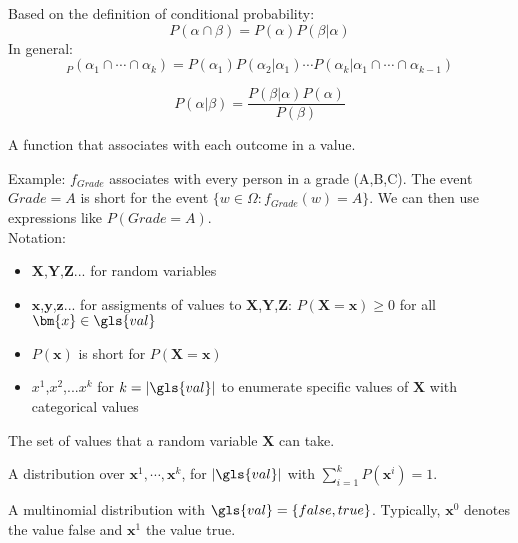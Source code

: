 {%
  Based on the definition of \gls{conditional probability}:
  \begin{equation*}
    P(\alpha\cap\beta)=P(\alpha)P(\beta|\alpha)
  \end{equation*}
  In general:
  \begin{equation*}
    _P(\alpha_1\cap\cdots\cap\alpha_k)=P(\alpha_1)P(\alpha_2|\alpha_1)\cdots P(\alpha_k|\alpha_1\cap\cdots\cap\alpha_{k-1})
  \end{equation*}
}

{%
  \begin{equation*}
    P(\alpha|\beta)=\frac{P(\beta|\alpha)P(\alpha)}{P(\beta)}
  \end{equation*}
}

{%
  A function that associates with each outcome in  a value.

  Example: $f_{Grade}$ associates with every person in  a grade (A,B,C). The event $Grade=A$ is short for the event $\{w\in\Omega:f_{Grade}(w)=A\}$. We can then use expressions like $P(Grade=A)$.\\

  Notation:
  \begin{itemize}
    \item  $\bm{X}$,$\bm{Y}$,$\bm{Z}$... for random variables
    \item  $\bm{x}$,$\bm{y}$,$\bm{z}$... for assigments of values to  $\bm{X}$,$\bm{Y}$,$\bm{Z}$: $P(\bm{X}=\bm{x})\geq0 $ for all $\bm{x}\in \gls{val}$
    \item  $P(\bm{x})$ is short for $P(\bm{X}=\bm{x})$
    \item  $x^1$,$x^2$,...$x^k$ for $k=|\gls{val}|$ to enumerate specific values of $\bm{X}$ with categorical values
  \end{itemize}
}

{%
  The set of values that a \gls{random variable} $\bm{X}$ can take.
}

{%
  A distribution over $\bm{x}^1,\cdots,\bm{x}^k$, for $|\gls{val}|$ with $\sum_{i=1}^k P(\bm{x}^i)=1$.
}

{%
  A \gls{multinomial distribution} with $\gls{val}=\{false,true\}$. Typically, $\bm{x}^0$ denotes the value false and $\bm{x}^1$ the value true.
}


